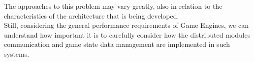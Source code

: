 The approaches to this problem may vary greatly, also in relation to the characteristics of the architecture that is being developed. \\
Still, considering the general performance requirements of Game Engines, we can understand how important it is to carefully consider how the distributed modules communication and game state data management are implemented in such systems.